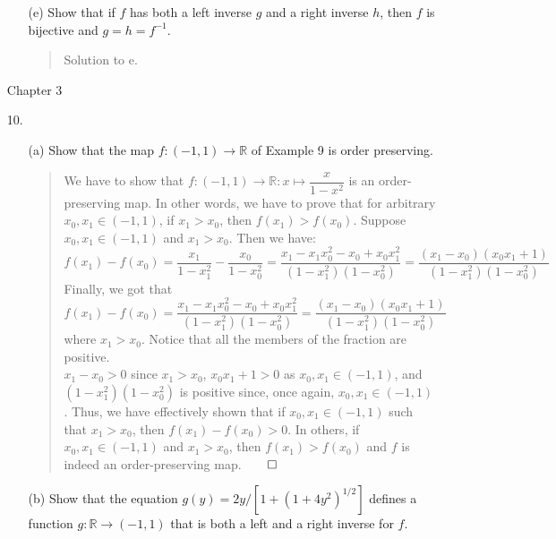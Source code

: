 \documentclass[12pt, a4paper]{article}
\newcommand{\reals}{\mathbb{R}} %
\newcommand{\rarr}{\rightarrow}
\begin{document}
\begin{itemize}
\begin{itemize}
\item[]

\item[(e)]
Show that if $f$ has both a left inverse $g$ and a right inverse $h$, then $f$
is bijective and $g = h = f^{-1}$.
\begin{quote}
Solution to e.
\end{quote}

\end{itemize}

\item[]
\item[]
\item[]

{\large Chapter 3}
\vspace{0.3cm}

\item[10.]
\begin{itemize}
\item[(a)]
Show that the map $f : (-1, 1) \rarr \reals$ of Example 9 is order preserving.
\begin{quote}
We have to show that $f : (-1, 1) \rarr \reals : x \mapsto \dfrac{x}{1 - x^2}$ is
an order-preserving map. In other words, we have to prove that for arbitrary $x_0, x_1 \in (-1, 1)$,
if $x_1 > x_0$, then $f(x_1) > f(x_0)$. Suppose $x_0, x_1 \in (-1, 1)$ and $x_1 > x_0$.
Then we have:
$$f(x_1) - f(x_0) = \dfrac{x_1}{1 - x_1^2} - \dfrac{x_0}{1 - x_0^2} = \dfrac{x_1 - x_1x_0^2 - x_0 + x_0x_1^2}{(1 - x_1^2)(1 - x_0^2)} = \dfrac{(x_1 - x_0)(x_0x_1 + 1)}{(1 - x_1^2)(1 - x_0^2)}$$
\vspace{0.15cm}
Finally, we got that $f(x_1) - f(x_0) = \dfrac{x_1 - x_1x_0^2 - x_0 + x_0x_1^2}{(1 - x_1^2)(1 - x_0^2)} = \dfrac{(x_1 - x_0)(x_0x_1 + 1)}{(1 - x_1^2)(1 - x_0^2)}$
where $x_1 > x_0$. Notice that all the members of the fraction are positive.\\
$x_1 - x_0 > 0$ since $x_1 > x_0$, $x_0x_1 + 1 > 0$ as $x_0, x_1 \in (-1, 1)$, and $(1 - x_1^2)(1 - x_0^2)$ is positive
since, once again, $x_0, x_1 \in (-1, 1)$. Thus, we have effectively shown that if $x_0, x_1 \in (-1, 1)$ such that $x_1 > x_0$,
then $f(x_1) - f(x_0) > 0$. In others, if $x_0, x_1 \in (-1, 1)$ and $x_1 > x_0$, then $f(x_1) > f(x_0)$ and $f$ is indeed an order-preserving map.$\qed$
\end{quote}

\item[]

\item[(b)]
Show that the equation $g(y) = 2y / [1 + (1 + 4y^2)^{1/2}]$ defines a function
$g : \reals \rarr (-1, 1)$ that is both a left and a right inverse for $f$.


\end{itemize}
\end{itemize}
\end{document}
